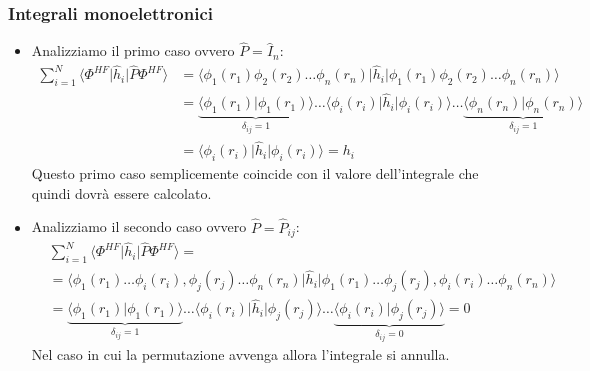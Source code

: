 \documentclass[oneside]{amsbook}
\numberwithin{section}{chapter}
\numberwithin{equation}{section}
\numberwithin{figure}{section}
\begin{document}
\subsubsection{Integrali monoelettronici}
\begin{itemize}
\item Analizziamo il primo caso ovvero $\hat{P}=\hat{I}_n $:
\begin{equation}
\begin{aligned}
\sum \limits_{i=1} ^{N}  \langle \Phi^{HF}\vert\hat{h}_i\vert\hat{P}\Phi^{HF}\rangle &= \langle\phi_1(r_1)\phi_2(r_2)\ldots \phi_n(r_n)\vert\hat{h}_i\vert\phi_1(r_1)\phi_2(r_2)\ldots \phi_n(r_n)\rangle \\
&= \underbrace{\langle\phi_1(r_1)\vert\phi_1(r_1)\rangle}_{\delta_{ij}=1} \ldots \langle\phi_i(r_i)\vert\hat{h}_i\vert\phi_i(r_i)\rangle \ldots \underbrace{\langle\phi_n(r_n)\vert\phi_n(r_n)\rangle}_{\delta_{ij}=1}\\
&= \langle\phi_i(r_i)\vert\hat{h}_i\vert\phi_i(r_i)\rangle = h_i
\end{aligned}
\end{equation}
Questo primo caso semplicemente coincide con il valore dell'integrale che quindi dovrà essere calcolato.
\item Analizziamo il secondo caso ovvero $\hat{P}=\hat{P}_{ij} $:
\begin{equation}
\begin{aligned}
&\sum \limits_{i=1} ^{N}  \langle \Phi^{HF}\vert\hat{h}_i\vert\hat{P}\Phi^{HF}\rangle = \\
&= \langle\phi_1(r_1)\ldots\phi_i(r_i),\phi_j(r_j)\ldots \phi_n(r_n)\vert\hat{h}_i\vert\phi_1(r_1)\ldots\phi_j(r_j),\phi_i(r_i)\ldots \phi_n(r_n)\rangle \\
&= \underbrace{\langle\phi_1(r_1)\vert\phi_1(r_1)\rangle}_{\delta_{ij}=1} \ldots \langle\phi_i(r_i)\vert\hat{h}_i\vert\phi_j(r_j)\rangle \ldots \underbrace{\langle\phi_i(r_i)\vert\phi_j(r_j)\rangle}_{\delta_{ij}=0}=0
\end{aligned}
\end{equation}
Nel caso in cui la permutazione avvenga allora l'integrale si annulla.
\end{itemize}
\end{document}
